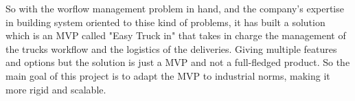 So with the worflow management problem in hand, and the company's expertise in building
system oriented to thise kind of problems, it has built a solution  which is an MVP
called "Easy Truck in" that takes in charge the management of the trucks workflow
and the logistics of the deliveries. Giving multiple features and options but the 
solution is just a MVP and not a full-fledged product. So the main goal of this project
is to adapt the MVP to industrial norms, making it more rigid and scalable.
